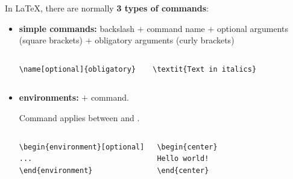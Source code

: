 \begin{frame}[fragile]

In \LaTeX , there are normally \textbf{3 types of commands}:

\begin{itemize}
	\item \textbf{simple commands:} backslash $+$ command name $+$ optional arguments (square brackets) $+$ obligatory arguments (curly brackets)

\vspace{-.5cm}

\begin{columns}
	
\begin{lstlisting}
\name[optional]{obligatory} 
\end{lstlisting}

	
\begin{lstlisting}
\textit{Text in italics} 
\end{lstlisting}
	
\end{columns}
\end{itemize}


\begin{itemize}
	\item \textbf{environments:}  $+$  command. 
		
	Command applies between  and .

\vspace{-.5cm}

\begin{columns}
	
\begin{lstlisting}
\begin{environment}[optional]
...
\end{environment}

\end{lstlisting}


\begin{lstlisting}
\begin{center}
Hello world!
\end{center}
\end{lstlisting}

\end{columns}
\end{itemize}


\end{frame}
